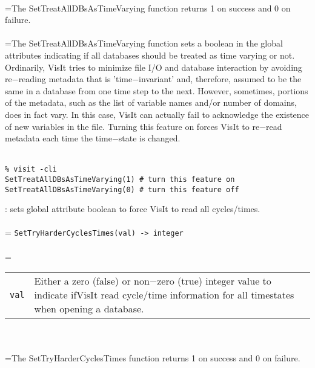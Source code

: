 \documentclass[10pt,a4paper]{report}
\begin{document}
 \\ 
\hangindent=\parindent The SetTreatAllDBsAsTimeVarying function returns 1 on success and 0 on failure. \\[-3mm] 

 \\ 
\hangindent=\parindent The SetTreatAllDBsAsTimeVarying function sets a boolean in the global attributes indicating if all databases should be treated as time varying or not. Ordinarily, VisIt tries to minimize file I/O and database interaction by avoiding re$-$reading metadata that is 'time$-$invariant' and, therefore, assumed to be the same in a database from one time step to the next. However, sometimes, portions of the metadata, such as the list of variable names and/or number of domains, does in fact vary. In this case, VisIt can actually fail to acknowledge the existence of new variables in the file. Turning this feature on forces VisIt to re$-$read metadata each time the time$-$state is changed. \\[-3mm] 

\\[-6mm]
\begin{verbatim}% visit -cli
SetTreatAllDBsAsTimeVarying(1) # turn this feature on
SetTreatAllDBsAsTimeVarying(0) # turn this feature off
\end{verbatim}
\newpage


{}
: sets global attribute boolean to force VisIt to read all cycles/times.\\[-3mm]

 \\ 
\hangindent=\parindent 
\verb!SetTryHarderCyclesTimes(val) -> integer!\\ [-3mm]

 \\ 
\hangindent=\parindent 
\begin{tabular}{lp{9cm}}
\verb!val! & Either a zero (false) or non$-$zero (true) integer value to indicate ifVisIt read cycle/time information for all timestates when opening a database. \\
\end{tabular} \\[-2mm]


 \\ 
\hangindent=\parindent The SetTryHarderCyclesTimes function returns 1 on success and 0 on failure. \\[-3mm] 
\end{document}
